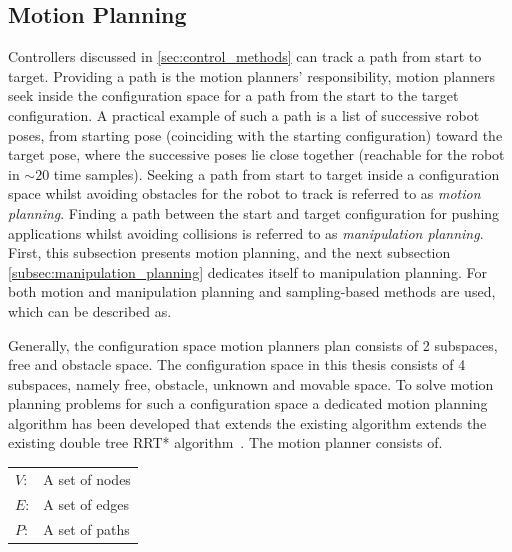 \subsection{Motion Planning}%
\label{subsec:motion_planning}
Controllers discussed in \cref{sec:control_methods} can track a path from start to target. Providing a path is the motion planners' responsibility, motion planners seek inside the configuration space for a path from the start to the target configuration. A practical example of such a path is a list of successive robot poses, from starting pose (coinciding with the starting configuration) toward the target pose, where the successive poses lie close together 
(reachable for the robot in $\sim20$ time samples). Seeking a path from start to target inside a configuration space whilst avoiding obstacles for the robot to track is referred to as \textit{motion planning}. Finding a path between the start and target configuration for pushing applications whilst avoiding collisions is referred to as \textit{manipulation planning}. First, this subsection presents motion planning, and the next subsection \cref{subsec:manipulation_planning} dedicates itself to manipulation planning. For both motion and manipulation planning and sampling-based methods are used, which can be described as.\bs

\textit{}\bs

Generally, the configuration space motion planners plan consists of 2 subspaces, free and obstacle space. The configuration space in this thesis consists of 4 subspaces, namely free, obstacle, unknown and movable space. To solve motion planning problems for such a configuration space a dedicated motion planning algorithm has been developed that extends the existing algorithm extends the existing double tree \ac{RRT*} algorithm~\cite{chen_fast_2018}. The motion planner consists of.
\begin{center}
\begin{tabular}[t]{l p{10cm}}
$V$:& A set of nodes\\
$E$:& A set of edges\\
$P$:& A set of paths\\
\end{tabular}
\end{center}

